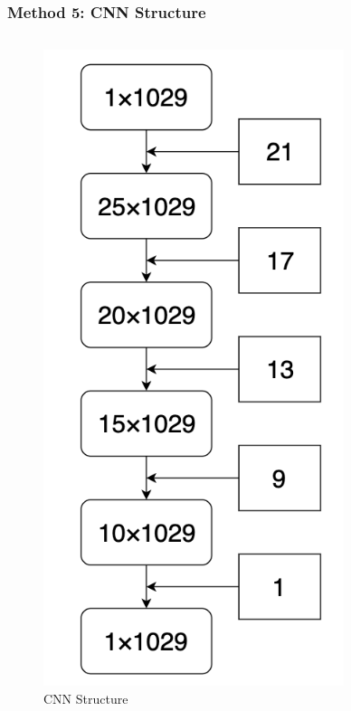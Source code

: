 \documentclass{beamer}
\begin{document}
\begin{frame}
\frametitle{Method 5: CNN Structure}
\begin{columns}
\begin{figure}[H]
    \centering
    \caption{CNN Structure}
    \includegraphics[width=0.8\textwidth]{img/model.png}
\end{figure}

\end{columns}
\end{frame}
\end{document}
